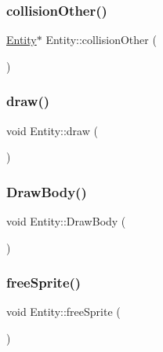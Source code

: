 \mbox{\label{class_entity_a2973af105530eb9cb150afd7892e7a6e}} 
\subsubsection{\texorpdfstring{collision\+Other()}{collisionOther()}}
{\footnotesize\ttfamily \hyperlink{class_entity}{Entity}$\ast$ Entity\+::collision\+Other (\begin{DoxyParamCaption}{ }\end{DoxyParamCaption})\hspace{0.3cm}{\ttfamily [inline]}}

\mbox{\label{class_entity_a7666f416dd0d1fce0f1133f78df44476}} 
\subsubsection{\texorpdfstring{draw()}{draw()}}
{\footnotesize\ttfamily void Entity\+::draw (\begin{DoxyParamCaption}{ }\end{DoxyParamCaption})}

\mbox{\label{class_entity_a947298b3c4449adee232c1d1f589de8c}} 
\subsubsection{\texorpdfstring{Draw\+Body()}{DrawBody()}}
{\footnotesize\ttfamily void Entity\+::\+Draw\+Body (\begin{DoxyParamCaption}{ }\end{DoxyParamCaption})\hspace{0.3cm}{\ttfamily [private]}}

\mbox{\label{class_entity_a6adec3bcec396133896aaecdb13f87e0}} 
\subsubsection{\texorpdfstring{free\+Sprite()}{freeSprite()}}
{\footnotesize\ttfamily void Entity\+::free\+Sprite (\begin{DoxyParamCaption}{ }\end{DoxyParamCaption})}


